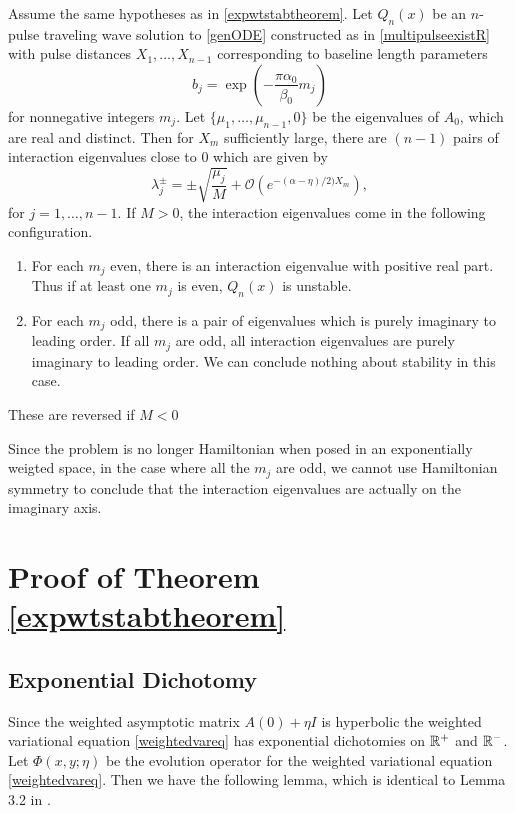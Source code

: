 \documentclass[thesis.tex]{subfiles}
\begin{document}
\begin{corollary}\label{corr:eiglocR}
Assume the same hypotheses as in \cref{expwtstabtheorem}. Let $Q_n(x)$ be an $n$-pulse traveling wave solution to \cref{genODE} constructed as in \cref{multipulseexistR} with pulse distances $X_1, \dots, X_{n-1}$ corresponding to baseline length parameters
\[
b_j = \exp\left(-\frac{\pi \alpha_0}{\beta_0}m_j \right)
\]
for nonnegative integers $m_j$. Let $\{ \mu_1, \dots, \mu_{n-1}, 0 \}$ be the eigenvalues of $A_0$, which are real and distinct. Then for $X_m$ sufficiently large, there are $(n-1)$ pairs of interaction eigenvalues close to 0 which are given by
\begin{equation*}
\lambda_j^\pm = \pm \sqrt{\frac{\mu_j}{M}} + 
\mathcal{O}\left (e^{-(\alpha - \eta)/2) X_m} \right),
\end{equation*}
for $j = 1,\dots,n-1$. If $M > 0$, the interaction eigenvalues come in the following configuration.
\begin{enumerate}
	\item For each $m_j$ even, there is an interaction eigenvalue with positive real part. Thus if at least one $m_j$ is even, $Q_n(x)$ is unstable.
	\item For each $m_j$ odd, there is a pair of eigenvalues which is purely imaginary to leading order. If all $m_j$ are odd, all interaction eigenvalues are purely imaginary to leading order. We can conclude nothing about stability in this case.
\end{enumerate}
These are reversed if $M < 0$
\end{corollary}

\begin{remark}
Since the problem is no longer Hamiltonian when posed in an exponentially weigted space, in the case where all the $m_j$ are odd, we cannot use Hamiltonian symmetry to conclude that the interaction eigenvalues are actually on the imaginary axis.
\end{remark}

\section{Proof of Theorem \ref{expwtstabtheorem}}

\subsection{Exponential Dichotomy}

Since the weighted asymptotic matrix $A(0) + \eta I$ is hyperbolic the weighted variational equation \cref{weightedvareq} has exponential dichotomies on $\mathbb{R}^+$ and $\mathbb{R}^-$. Let $\Phi(x, y; \eta)$ be the evolution operator for the weighted variational equation \cref{weightedvareq}. Then we have the following lemma, which is identical to Lemma 3.2 in \cite{Sandstede1998}.
\end{document}
